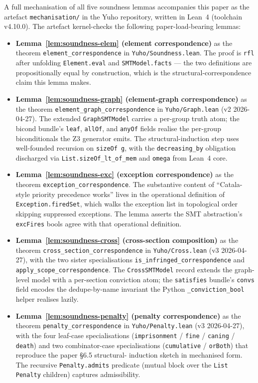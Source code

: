 A full mechanisation of all five soundness lemmas accompanies
this paper as the artefact \texttt{mechanisation/} in the Yuho
repository, written in Lean~4 (toolchain v4.10.0).
The artefact kernel-checks the following paper-load-bearing
lemmas:

\begin{itemize}
  \item \textbf{Lemma~\ref{lem:soundness-elem} (element
    correspondence)} as the theorem
    \texttt{element\_correspondence} in
    \texttt{Yuho/Soundness.lean}. The proof is \texttt{rfl} after
    unfolding \texttt{Element.eval} and \texttt{SMTModel.facts} ---
    the two definitions are propositionally equal by construction,
    which is the structural-correspondence claim this lemma makes.
  \item \textbf{Lemma~\ref{lem:soundness-graph} (element-graph
    correspondence)} as the theorem
    \texttt{element\_graph\_correspondence} in
    \texttt{Yuho/Graph.lean} (v2 2026-04-27). The extended
    \texttt{GraphSMTModel} carries a per-group truth atom; the
    bicond bundle's \texttt{leaf}, \texttt{allOf}, and
    \texttt{anyOf} fields realise the per-group biconditionals
    the Z3 generator emits. The structural-induction step uses
    well-founded recursion on \texttt{sizeOf g}, with the
    \texttt{decreasing\_by} obligation discharged via
    \texttt{List.sizeOf\_lt\_of\_mem} and \texttt{omega} from
    Lean~4 core.
  \item \textbf{Lemma~\ref{lem:soundness-exc} (exception
    correspondence)} as the theorem
    \texttt{exception\_correspondence}. The substantive content
    of ``Catala-style priority precedence works'' lives in the
    operational definition of \texttt{Exception.firedSet}, which
    walks the exception list in topological order skipping
    suppressed exceptions. The lemma asserts the SMT
    abstraction's \texttt{excFires} bools agree with that
    operational definition.
  \item \textbf{Lemma~\ref{lem:soundness-cross} (cross-section
    composition)} as the theorem
    \texttt{cross\_section\_correspondence} in
    \texttt{Yuho/Cross.lean} (v3 2026-04-27), with the two
    sister specialisations \texttt{is\_infringed\_correspondence}
    and \texttt{apply\_scope\_correspondence}. The
    \texttt{CrossSMTModel} record extends the graph-level model
    with a per-section conviction atom; the \texttt{satisfies}
    bundle's \texttt{convs} field encodes the dedupe-by-name
    invariant the Python \texttt{\_conviction\_bool} helper
    realises lazily.
  \item \textbf{Lemma~\ref{lem:soundness-penalty} (penalty
    correspondence)} as the theorem
    \texttt{penalty\_correspondence} in
    \texttt{Yuho/Penalty.lean} (v3 2026-04-27), with the four
    leaf-case specialisations (\texttt{imprisonment} /
    \texttt{fine} / \texttt{caning} / \texttt{death}) and two
    combinator-case specialisations (\texttt{cumulative} /
    \texttt{orBoth}) that reproduce the paper §6.5 structural-
    induction sketch in mechanised form. The recursive
    \texttt{Penalty.admits} predicate (mutual block over the
    \texttt{List Penalty} children) captures admissibility.
\end{itemize}

